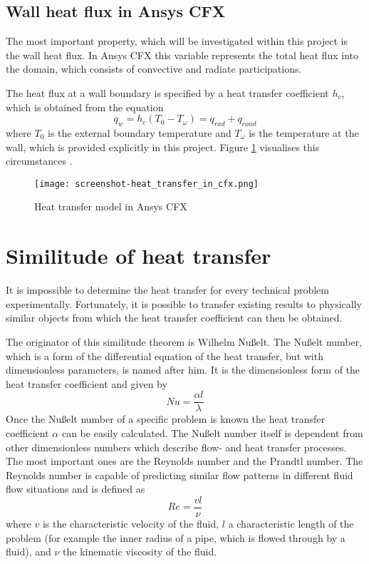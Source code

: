 \subsection{Wall heat flux in Ansys CFX}
The most important property, which will be investigated within this project is the wall heat flux. In Ansys CFX this variable represents the total heat flux into the domain, which consists of convective and radiate participations.

The heat flux at a wall boundary is specified by a heat transfer coefficient $h_c$, which is obtained from the equation
\begin{equation}
q_w = h_c (T_0 - T_{\omega} ) = q_{rad} + q_{cond}
\end{equation}
where $T_0$ is the external boundary temperature and $T_{\omega}$ is the temperature at the wall, which is provided explicitly in this project. Figure \ref{fig:ht_in_cfx} visualises this circumstances \cite{sas_ip}.
\begin{figure}[ht]
\centering
\texttt{[image: screenshot-heat\_transfer\_in\_cfx.png]}
\caption{\cite{sas_ip} Heat transfer model in Ansys CFX}
\label{fig:ht_in_cfx}
\end{figure}
\section{Similitude of heat transfer}
It is impossible to determine the heat transfer for every technical problem experimentally. Fortunately, it is possible to transfer existing results to physically similar objects from which the heat transfer coefficient can then be obtained.

The originator of this similitude theorem is Wilhelm Nußelt. The Nußelt number, which is a form of the differential equation of the heat transfer, but with dimensionless parameters, is named after him. It is the dimensionless form of the heat transfer coefficient and given by
\begin{equation}
\label{eq:Nu1}
Nu = \frac{\alpha l}{\lambda}
\end{equation}
Once the Nußelt number of a specific problem is known the heat transfer coefficient $\alpha$ can be easily calculated. The Nußelt number itself is dependent from other dimensionless numbers which describe flow- and heat transfer processes.
The most important ones are the Reynolds number and the Prandtl number. The Reynolds number is capable of predicting similar flow patterns in different fluid flow situations and is defined as 
\begin{equation}
Re = \frac{v l}{\nu}
\end{equation}
where $v$ is the characteristic velocity of the fluid, $l$ a characteristic length of the problem (for example the inner radius of a pipe, which is flowed through by a fluid), and $\nu$ the kinematic viscosity of the fluid.

